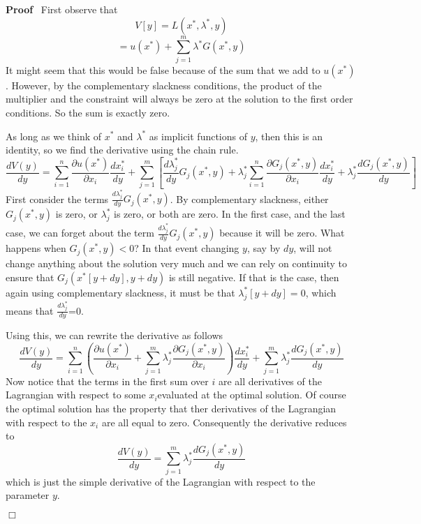 \documentclass[12pt]{article}
\newenvironment{proof}{
  \noindent\textbf{Proof}\ }{\hspace*{\fill}
  \begin{math}\Box\end{math}\medskip}
\begin{document}
\begin{proof}
  First observe that
  \[ V [ y ] = L ( x^{\ast}, \lambda^{\ast}, y ) \]
  \begin{equation}
    = u ( x^{\ast} ) + \sum_{j = 1}^m \lambda^{\ast} G ( x^{\ast}, y )
  \end{equation}
  It might seem that this would be false because of the sum that we add to $u
  ( x^{\ast} )$. However, by the complementary slackness conditions, the
  product of the multiplier and the constraint will always be zero at the
  solution to the first order conditions. So the sum is exactly zero.
  
  As long as we think of $x^{\ast}$ and $\lambda^{\ast}$ as implicit functions
  of $y$, then this is an identity, so we find the derivative using the chain
  rule.
  \[ \frac{d V ( y )}{d y} = \sum_{i = 1}^n \frac{\partial u ( x^{\ast}
     )}{\partial x_i} \frac{d x^{\ast}_i}{d y} + \sum_{j = 1}^m \left[ \frac{d
     \lambda_j^{\ast}}{d y} G_j ( x^{\ast}, y ) + \lambda^{\ast}_j \sum_{i =
     1}^n \frac{\partial G_j ( x^{\ast}, y )}{\partial x_i} \frac{d
     x^{\ast}_i}{d y} + \lambda^{\ast}_j \frac{d G_j ( x^{\ast}, y )}{d y}
     \right] \]
  First consider the terms $\frac{d \lambda_j^{\ast}}{d y} G_j ( x^{\ast}, y
  )$. By complementary slackness, either $G_j ( x^{\ast}, y )$ is zero, or
  $\lambda^{\ast}_j$ is zero, or both are zero. In the first case, and the
  last case, we can forget about the term $\frac{d \lambda_j^{\ast}}{d y} G_j
  ( x^{\ast}, y )$ because it will be zero. What happens when $G_j ( x^{\ast},
  y ) < 0$? In that event changing $y$, say by $d y$, will not change anything
  about the solution very much and we can rely on continuity to ensure that
  $G_j ( x^{\ast} [ y + d y ], y + d y )$ is still negative. If that is the
  case, then again using complementary slackness, it must be that
  $\lambda^{\ast}_j [ y + d y ] = 0$, which means that $\frac{d
  \lambda^{\ast}_j}{d y}$=0.
  
  Using this, we can rewrite the derivative as follows
  \[ \frac{d V ( y )}{d y} = \sum_{i = 1}^n \left( \frac{\partial u ( x^{\ast}
     )}{\partial x_i} + \sum_{j = 1}^m \lambda^{\ast}_j \frac{\partial G_j (
     x^{\ast}, y )}{\partial x_i} \right) \frac{d x^{\ast}_i}{d y} + \sum_{j =
     1}^m \lambda^{\ast}_j \frac{d G_j ( x^{\ast}, y )}{d y} \]
  Now notice that the terms in the first sum over $i$ are all derivatives of
  the Lagrangian with respect to some $x_i $evaluated at the optimal solution.
  Of course the optimal solution has the property that ther derivatives of the
  Lagrangian with respect to the $x_i$ are all equal to zero. Consequently the
  derivative reduces to
  \[ \frac{d V ( y )}{d y} = \sum_{j = 1}^m \lambda^{\ast}_j \frac{d G_j (
     x^{\ast}, y )}{d y} \]
  which is just the simple derivative of the Lagrangian with respect to the
  parameter $y$.
  
  
\end{proof}
\end{document}
